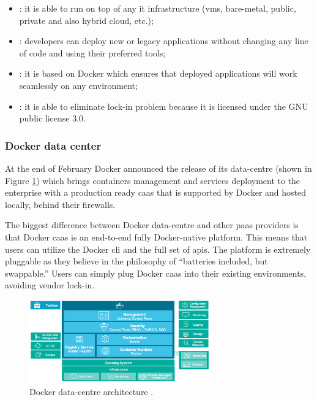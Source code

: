 \begin{itemize}
	\item{: it is able to run on top of any \acs{it} infrastructure
		(\ac{vm}s, bare-metal, public, private and also hybrid cloud, etc.);}
	\item{: developers can deploy new or legacy applications without changing any line
		of code and using their preferred tools;}
	\item{: it is based on Docker which ensures that deployed applications will
		work seamlessly on any environment;}
	\item{: it is able to eliminate lock-in problem because it is licensed under
		the GNU public license 3.0.}
\end{itemize}

\subsubsection{Docker data center}
\label{sec:background-paas-platforms-dockerDataCentre}
At the end of February Docker announced \cite{dockerDataCentrePresentation} the release of its data-centre
\cite{dockerDataCentre} (shown in Figure \ref{img:background-cloudPlatform-dockerDataCetre}) which
brings containers management and services deployment to the enterprise
with a production ready \ac{caas} that is supported by Docker and hosted locally, behind their firewalls.

The biggest difference between Docker data-centre and other \ac{paas} providers is that Docker \ac{caas}
is an end-to-end fully Docker-native platform. This means that users can utilize the Docker \ac{cli}
and the full set of \acs{api}s. The platform is extremely pluggable as they believe in the philosophy of
``batteries included, but swappable.'' Users can simply plug Docker \ac{caas} into their existing
environments, avoiding vendor lock-in.

\begin{figure}
	\centering{}
	\includegraphics[width=0.7\textwidth]{chapters/background/images/docker-datacentre.png}
	\caption[Docker data-centre architecture]{Docker data-centre architecture \cite{dockerDataCentreArchitecture}.}
	\label{img:background-cloudPlatform-dockerDataCetre}
\end{figure}

